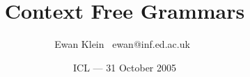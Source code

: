 % 
%
%
%
%
%
%
%
%
%
%
%
%
%
%
%
%
%
%
%
%
%
%
%
%
%
%

\title{Context Free Grammars}
\author{Ewan Klein \newline \mbox{ }ewan@inf.ed.ac.uk\mbox{ }}
\date{ICL --- 31 October 2005}



\usepackage{array}
\usepackage{url}
\usepackage{alltt}


\usepackage{color}
\usepackage{amsmath}
\usepackage{graphicx}

\usepackage{synttree}
\branchheight{5ex}



